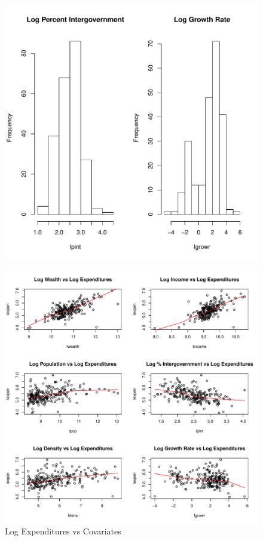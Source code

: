 \documentclass{article}\usepackage[]{graphicx}\usepackage[]{color}
\makeatletter
\def\maxwidth{ %
  \ifdim\Gin@nat@width>\linewidth
    \linewidth
  \else
    \Gin@nat@width
  \fi
}
\newenvironment{knitrout}{}{} %
\makeatother
\begin{document}
\begin{figure}
\begin{center}
\begin{knitrout}
\includegraphics[width=\maxwidth,height=0.3\textheight]{figure/Log_Transformed_Predictors-3} 

\end{knitrout}
  \end{center}
\end{figure}
%
\begin{figure}
\begin{center}
\caption{Log Expenditures vs Covariates}
\label{scatterplots}
\begin{knitrout}
\color{fgcolor}
\includegraphics[width=0.7\linewidth]{figure/Expend_vs_Covariates-1} 

\end{knitrout}
\end{center}
\end{figure}
%
\end{document}
